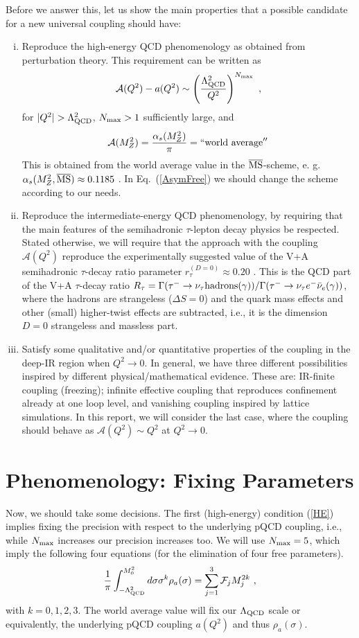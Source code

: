 \documentclass[3p,times,twocolumn]{elsarticle}
\def\be{\begin{equation}}
\def\ee{\end{equation}}
\newcommand{\A}{{\mathcal{A}}}
\begin{document}
Before we answer this, let us show the main properties that a possible candidate for a new universal coupling should have:
\begin{enumerate}[(i)]
\item \label{HE} Reproduce the high-energy QCD phenomenology as obtained from perturbation theory. This requirement can be written as 
\be
\A(Q^2) - a(Q^2)   \sim \left( \frac{\Lambda^2_{\rm QCD}}{Q^2} \right)^{N_{\rm max}} \ ,
\label{Aadiff1}
\ee
for $|Q^2| > \Lambda^2_{\rm QCD}$, $N_{\rm max}>1$ sufficiently large, and 
\be
\A(M_Z^2)=\frac{\alpha_s(M_Z^2)}{\pi}=``{\rm world\ average}''
\label{AsymFree}
\ee
This is obtained from the world average value in the $\overline{\rm MS}$-scheme, e. g. 
$\alpha_s(M_Z^2,\overline{\rm MS})\approx0.1185$ \cite{PDG}. In Eq.~(\ref{AsymFree}) we should change the scheme according to our needs. 
\item \label{IE} Reproduce the intermediate-energy QCD phenomenology, by requiring that the main features of the semihadronic $\tau$-lepton decay physics be respected. Stated otherwise, we will require that the approach with the coupling $\A(Q^2)$ reproduce the experimentally suggested value of the V+A semihadronic $\tau$-decay ratio parameter $r^{(D=0)}_{\tau} \approx 0.20$ \cite{ALEPH2,DDHMZ}. This is the QCD part of the V+A $\tau$-decay ratio $R_{\tau} = \Gamma(\tau^- \to \nu_{\tau}{\rm hadrons}(\gamma))/\Gamma(\tau^- \to \nu_{\tau} e^- {\bar \nu}_e (\gamma))$, where the hadrons are strangeless ($\Delta S=0$) and the quark mass effects and other (small) higher-twist effects are subtracted, i.e., it is the dimension $D=0$ strangeless and massless part.
\item \label{LE} Satisfy some qualitative and/or quantitative properties of the coupling in the deep-IR region when $Q^2\to0$. In general, we have three different possibilities inspired by different physical/mathematical evidence. These are: IR-finite coupling (freezing); infinite effective coupling that reproduces confinement already at one loop level, and vanishing coupling inspired by lattice simulations. In this report, we will consider the last case, where the coupling should behave as $\A(Q^2)\sim Q^2$ at $Q^2\to0$.
\end{enumerate}


\section{Phenomenology: Fixing Parameters}

Now, we should take some decisions. The first (high-energy) condition (\ref{HE}) implies fixing the precision with respect to the underlying pQCD coupling, i.e., while $N_{\rm max}$ increases our precision increases too. We will use $N_{\rm max}=5$, which imply the following four equations (for the elimination of four free parameters). 
\be
\frac{1}{\pi} \int_{-\Lambda_{\rm QCD}^2}^{M_0^2} d \sigma \sigma^k \rho_a(\sigma)=\sum_{j=1}^3 {\cal F}_j M_j^{2 k}\ ,
\label{1u}
\ee
with $k=0,1,2,3$. The world average value will fix our $\Lambda_{\rm QCD}$ scale or equivalently, the underlying pQCD coupling $a(Q^2)$ and thus $\rho_a(\sigma)$.
\end{document}
